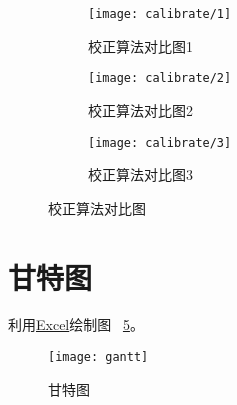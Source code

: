 \documentclass[../main]{subfiles}
\begin{document}
\begin{figure}[htbp]
  \centering
  \begin{subfigure}[htbp]{\linewidth}
    \centering
    \texttt{[image: calibrate/1]}
    \caption{校正算法对比图1}%
    \label{fig:calibrate/1}
  \end{subfigure}

  \begin{subfigure}[htbp]{\linewidth}
    \centering
    \texttt{[image: calibrate/2]}
    \caption{校正算法对比图2}%
    \label{fig:calibrate/2}
  \end{subfigure}

  \begin{subfigure}[htbp]{\linewidth}
    \centering
    \texttt{[image: calibrate/3]}
    \caption{校正算法对比图3}%
    \label{fig:calibrate/3}
  \end{subfigure}
  \caption{校正算法对比图}%
  \label{fig:calibrate}
\end{figure}

\section{甘特图}%
\label{sec:gantt}

利用\href{https://www.microsoft.com/en-us/microsoft-365/excel}{Excel}绘制图%
~\ref{fig:gantt}。

\begin{figure}[htbp]
  \centering
  \texttt{[image: gantt]}
  \caption{甘特图}%
  \label{fig:gantt}
\end{figure}
\end{document}

